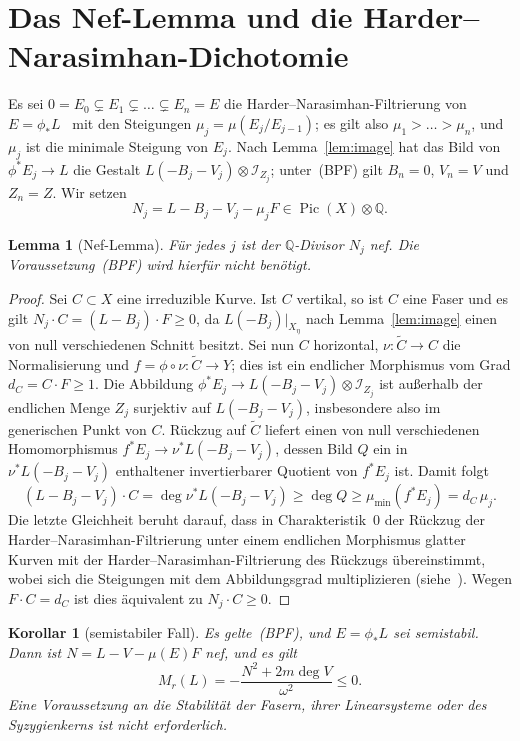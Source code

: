 \documentclass[11pt]{article}
\newtheorem{lemma}[theorem]{Lemma}
\newtheorem{corollary}[theorem]{Korollar}
\theoremstyle{definition}
\theoremstyle{remark}
\DeclareMathOperator{\Pic}{Pic}
\newcommand{\cI}{\mathcal{I}}
\newcommand{\bpf}{\textup{(BPF)}}
\begin{document}
\section{Das Nef-Lemma und die Harder--Narasimhan-Dichotomie}\label{sec:nef}

Es sei $0=E_0\subsetneq E_1\subsetneq\dots\subsetneq E_n=E$ die
Harder--Narasimhan-Filtrierung von $E=\phi_*L$~\cite{HN75} mit den Steigungen
$\mu_j=\mu(E_j/E_{j-1})$; es gilt also $\mu_1>\dots>\mu_n$, und $\mu_j$ ist die
minimale Steigung von $E_j$. Nach Lemma~\ref{lem:image} hat das Bild von
$\phi^*E_j\to L$ die Gestalt $L(-B_j-V_j)\otimes\cI_{Z_j}$; unter~\bpf{} gilt
$B_n=0$, $V_n=V$ und $Z_n=Z$. Wir setzen
\[
N_j=L-B_j-V_j-\mu_jF\in\Pic(X)\otimes\mathbb{Q}.
\]

\begin{lemma}[Nef-Lemma]\label{lem:nef}
Für jedes $j$ ist der $\mathbb{Q}$-Divisor $N_j$ nef. Die
Voraussetzung~\bpf{} wird hierfür nicht benötigt.
\end{lemma}

\begin{proof}
Sei $C\subset X$ eine irreduzible Kurve. Ist $C$ vertikal, so ist $C$ eine Faser
und es gilt $N_j\cdot C=(L-B_j)\cdot F\ge 0$, da $L(-B_j)|_{X_\eta}$ nach
Lemma~\ref{lem:image} einen von null verschiedenen Schnitt besitzt. Sei nun $C$
horizontal, $\nu\colon\widetilde C\to C$ die Normalisierung und
$f=\phi\circ\nu\colon\widetilde C\to Y$; dies ist ein endlicher Morphismus vom
Grad $d_C=C\cdot F\ge 1$. Die Abbildung
$\phi^*E_j\to L(-B_j-V_j)\otimes\cI_{Z_j}$ ist außerhalb der endlichen Menge
$Z_j$ surjektiv auf $L(-B_j-V_j)$, insbesondere also im generischen Punkt von
$C$. Rückzug auf $\widetilde C$ liefert einen von null verschiedenen
Homomorphismus $f^*E_j\to\nu^*L(-B_j-V_j)$, dessen Bild $Q$ ein in
$\nu^*L(-B_j-V_j)$ enthaltener invertierbarer Quotient von $f^*E_j$ ist. Damit
folgt
\[
(L-B_j-V_j)\cdot C=\deg\nu^*L(-B_j-V_j)\ge\deg Q\ge\mu_{\min}(f^*E_j)=d_C\,\mu_j .
\]
Die letzte Gleichheit beruht darauf, dass in Charakteristik~$0$ der Rückzug der
Harder--Narasimhan-Filtrierung unter einem endlichen Morphismus glatter Kurven
mit der Harder--Narasimhan-Filtrierung des Rückzugs übereinstimmt, wobei sich die
Steigungen mit dem Abbildungsgrad multiplizieren (siehe~\cite[\S3.2]{HL10}). Wegen
$F\cdot C=d_C$ ist dies äquivalent zu $N_j\cdot C\ge 0$.
\end{proof}

\begin{corollary}[semistabiler Fall]\label{cor:ss}
Es gelte~\bpf, und $E=\phi_*L$ sei semistabil. Dann ist $N=L-V-\mu(E)F$ nef, und
es gilt
\[
M_r(L)=-\frac{N^2+2m\deg V}{\omega^2}\le 0 .
\]
Eine Voraussetzung an die Stabilität der Fasern, ihrer Linearsysteme oder des
Syzygienkerns ist nicht erforderlich.
\end{corollary}
\end{document}
